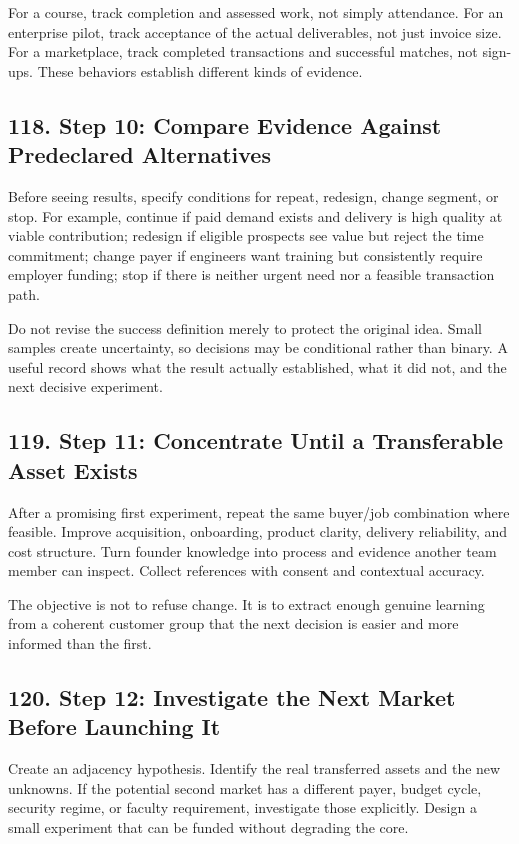 For a course, track completion and assessed work, not simply attendance. For an enterprise pilot, track acceptance of the actual deliverables, not just invoice size. For a marketplace, track completed transactions and successful matches, not sign-ups. These behaviors establish different kinds of evidence.

\subsection*{118. Step 10: Compare Evidence Against Predeclared Alternatives}

Before seeing results, specify conditions for repeat, redesign, change segment, or stop. For example, continue if paid demand exists and delivery is high quality at viable contribution; redesign if eligible prospects see value but reject the time commitment; change payer if engineers want training but consistently require employer funding; stop if there is neither urgent need nor a feasible transaction path.

Do not revise the success definition merely to protect the original idea. Small samples create uncertainty, so decisions may be conditional rather than binary. A useful record shows what the result actually established, what it did not, and the next decisive experiment.

\subsection*{119. Step 11: Concentrate Until a Transferable Asset Exists}

After a promising first experiment, repeat the same buyer/job combination where feasible. Improve acquisition, onboarding, product clarity, delivery reliability, and cost structure. Turn founder knowledge into process and evidence another team member can inspect. Collect references with consent and contextual accuracy.

The objective is not to refuse change. It is to extract enough genuine learning from a coherent customer group that the next decision is easier and more informed than the first.

\subsection*{120. Step 12: Investigate the Next Market Before Launching It}

Create an adjacency hypothesis. Identify the real transferred assets and the new unknowns. If the potential second market has a different payer, budget cycle, security regime, or faculty requirement, investigate those explicitly. Design a small experiment that can be funded without degrading the core.

